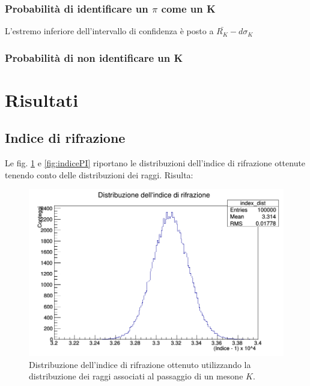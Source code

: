 \documentclass[8pt]{extarticle}
\begin{document}
\subsubsection{Probabilità di identificare un $\pi$ come un K}
L'estremo inferiore dell'intervallo di confidenza è posto a $\bar{R_K}-d\sigma_K$
\subsubsection{Probabilità di non identificare un K}

\section{Risultati}

\subsection{Indice di rifrazione}
Le fig. \ref{fig:indiceK} e \ref{fig:indicePI} riportano le distribuzioni dell'indice di rifrazione ottenute tenendo conto delle distribuzioni dei raggi. Risulta: \\

\begin{figure}
\begin{center}
\includegraphics[scale=0.4]{indiceK_definitivo}
\caption{Distribuzione dell'indice di rifrazione ottenuto utilizzando la distribuzione dei raggi associati al passaggio di un mesone $K$.}
\label{fig:indiceK}
\end{center}
\end{figure}
\end{document}
